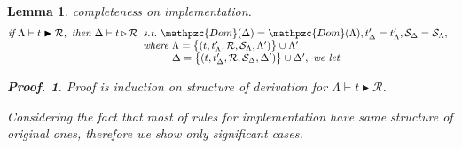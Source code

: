 \documentclass[12pt]{article}
\newtheorem{Lemma}{Lemma}[section]
\newtheorem{Proof}{Proof.}
\begin{document}
\begin{Lemma}{completeness on implementation.}
  \label{completeness_on_implementation}
  \[ \text{\it if}\ \Lambda \vdash t \blacktriangleright \mathcal{R},\
      \text{\it then}\ \Delta \vdash t \triangleright \mathcal{R}
       \begin{array}[t]{l}
         \text{\it s.t.}\ \mathpzc{Dom}(\Delta) = \mathpzc{Dom}(\Lambda),
          t'_\Delta = t'_\Lambda,
           \mathcal{S}_\Delta = \mathcal{S}_\Lambda,  \\           
         \text{\it where} \!\begin{array}[t]{l}
           \Lambda = \bigl\{(t, t'_\Lambda, \mathcal{R},
            \mathcal{S}_\Lambda, \Lambda') \bigr\} \cup \Lambda'  \\
           \Delta = \bigl\{(t, t'_\Delta, \mathcal{R},
            \mathcal{S}_\Delta, \Delta') \bigr\} \cup \Delta',\
             \text{\it we let}.
         \end{array}
       \end{array}
  \]
  \begin{Proof}
    Proof is induction on structure of derivation for
    $\Lambda \vdash t \blacktriangleright \mathcal{R}$.
    
    Considering the fact that most of rules for implementation have same
    structure of original ones, therefore we show only significant cases.
    

\end{Proof}
\end{Lemma}
\end{document}
